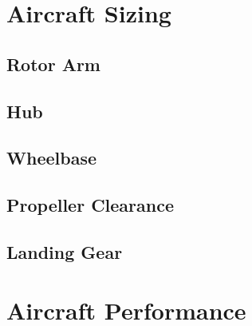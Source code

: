 \documentclass[12pt]{report}
\begin{document}
      
    \section{Aircraft Sizing}
      \subsection*{Rotor Arm}
      \subsection*{Hub}
      \subsection*{Wheelbase}
      \subsection*{Propeller Clearance}
      \subsection*{Landing Gear}
        
    \section{Aircraft Performance}
\end{document}
